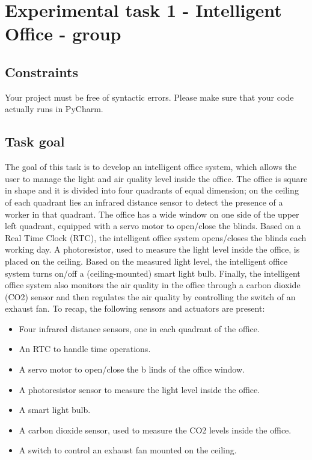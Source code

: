 \chapter{Experimental task 1 - Intelligent Office - \tdd group}
\section{Constraints}
Your project must be free of syntactic errors. Please make sure that your code actually runs in PyCharm.

\section{Task goal}
The goal of this task is to develop an intelligent office system, which allows the user to manage the light and air quality level inside the office.
The office is square in shape and it is divided into four quadrants of equal dimension; on the ceiling of each quadrant lies an infrared distance sensor to detect the presence of a worker in that quadrant. 
The office has a wide window on one side of the upper left quadrant, equipped with a servo motor to open/close the blinds. 
Based on a Real Time Clock (RTC), the intelligent office system opens/closes the blinds each working day. 
A photoresistor, used to measure the light level inside the office, is placed on the ceiling. Based on the measured light level, the intelligent office system turns on/off a (ceiling-mounted) smart light bulb. 
Finally, the intelligent office system also monitors the air quality in the office through a carbon dioxide (CO2) sensor and then regulates the air quality by controlling the switch of an exhaust fan.
To recap, the following sensors and actuators are present:

\begin{itemize}
    \item Four infrared distance sensors, one in each quadrant of the office.
    \item An RTC to handle time operations.
    \item A servo motor to open/close the b linds of the office window.
    \item A photoresistor sensor to measure the light level inside the office.
    \item A smart light bulb.
    \item A carbon dioxide sensor, used to measure the CO2 levels inside the office.
    \item A switch to control an exhaust fan mounted on the ceiling.
\end{itemize}

